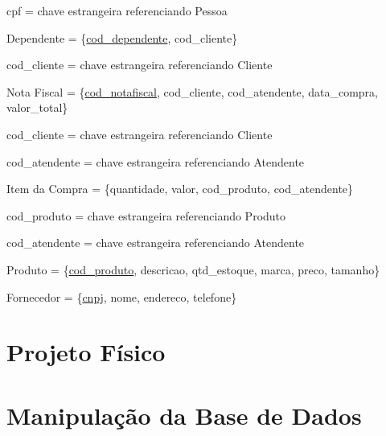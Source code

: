 \documentclass[a4paper,12pt]{article}
\begin{document}
	cpf = chave estrangeira referenciando Pessoa
	
	\begin{flushleft}
		Dependente = \{\uline{cod\_dependente}, cod\_cliente\}
	\end{flushleft}
	
	cod\_cliente = chave estrangeira referenciando Cliente
	
	\begin{flushleft}
		Nota Fiscal = \{\uline{cod\_notafiscal}, cod\_cliente, cod\_atendente, data\_compra, valor\_total\}
	\end{flushleft}
	
	cod\_cliente = chave estrangeira referenciando Cliente
	
	cod\_atendente = chave estrangeira referenciando Atendente
	
	\begin{flushleft}
		Item da Compra = \{quantidade, valor, cod\_produto, cod\_atendente\}
	\end{flushleft}
	
	cod\_produto = chave estrangeira referenciando Produto
	
	cod\_atendente = chave estrangeira referenciando Atendente
	
	\begin{flushleft}
		Produto = \{\uline{cod\_produto}, descricao, qtd\_estoque, marca, preco, tamanho\}
	\end{flushleft}
	
	\begin{flushleft}
		Fornecedor = \{\uline{cnpj}, nome, endereco, telefone\}
	\end{flushleft}
	\section{Projeto Físico}
	\section{Manipulação da Base de Dados}
\end{document}
